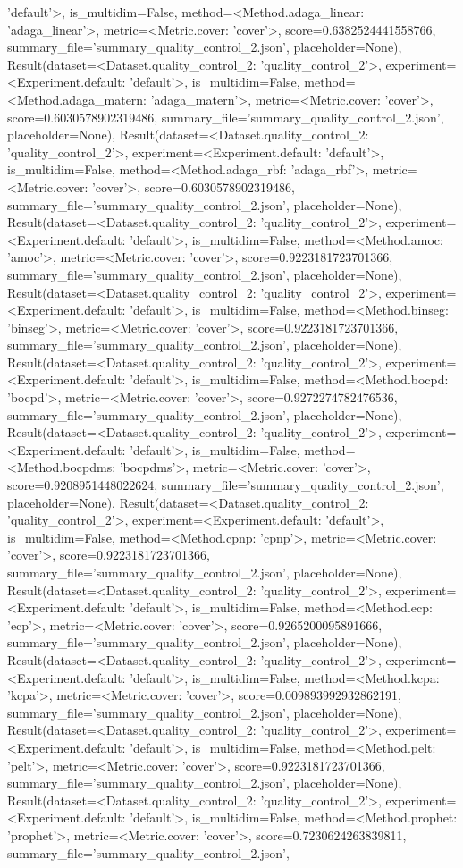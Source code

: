 'default'>, is_multidim=False, method=<Method.adaga_linear: 'adaga_linear'>, metric=<Metric.cover: 'cover'>, score=0.6382524441558766, summary_file='summary_quality_control_2.json', placeholder=None), Result(dataset=<Dataset.quality_control_2: 'quality_control_2'>, experiment=<Experiment.default: 'default'>, is_multidim=False, method=<Method.adaga_matern: 'adaga_matern'>, metric=<Metric.cover: 'cover'>, score=0.6030578902319486, summary_file='summary_quality_control_2.json', placeholder=None), Result(dataset=<Dataset.quality_control_2: 'quality_control_2'>, experiment=<Experiment.default: 'default'>, is_multidim=False, method=<Method.adaga_rbf: 'adaga_rbf'>, metric=<Metric.cover: 'cover'>, score=0.6030578902319486, summary_file='summary_quality_control_2.json', placeholder=None), Result(dataset=<Dataset.quality_control_2: 'quality_control_2'>, experiment=<Experiment.default: 'default'>, is_multidim=False, method=<Method.amoc: 'amoc'>, metric=<Metric.cover: 'cover'>, score=0.9223181723701366, summary_file='summary_quality_control_2.json', placeholder=None), Result(dataset=<Dataset.quality_control_2: 'quality_control_2'>, experiment=<Experiment.default: 'default'>, is_multidim=False, method=<Method.binseg: 'binseg'>, metric=<Metric.cover: 'cover'>, score=0.9223181723701366, summary_file='summary_quality_control_2.json', placeholder=None), Result(dataset=<Dataset.quality_control_2: 'quality_control_2'>, experiment=<Experiment.default: 'default'>, is_multidim=False, method=<Method.bocpd: 'bocpd'>, metric=<Metric.cover: 'cover'>, score=0.9272274782476536, summary_file='summary_quality_control_2.json', placeholder=None), Result(dataset=<Dataset.quality_control_2: 'quality_control_2'>, experiment=<Experiment.default: 'default'>, is_multidim=False, method=<Method.bocpdms: 'bocpdms'>, metric=<Metric.cover: 'cover'>, score=0.9208951448022624, summary_file='summary_quality_control_2.json', placeholder=None), Result(dataset=<Dataset.quality_control_2: 'quality_control_2'>, experiment=<Experiment.default: 'default'>, is_multidim=False, method=<Method.cpnp: 'cpnp'>, metric=<Metric.cover: 'cover'>, score=0.9223181723701366, summary_file='summary_quality_control_2.json', placeholder=None), Result(dataset=<Dataset.quality_control_2: 'quality_control_2'>, experiment=<Experiment.default: 'default'>, is_multidim=False, method=<Method.ecp: 'ecp'>, metric=<Metric.cover: 'cover'>, score=0.9265200095891666, summary_file='summary_quality_control_2.json', placeholder=None), Result(dataset=<Dataset.quality_control_2: 'quality_control_2'>, experiment=<Experiment.default: 'default'>, is_multidim=False, method=<Method.kcpa: 'kcpa'>, metric=<Metric.cover: 'cover'>, score=0.009893992932862191, summary_file='summary_quality_control_2.json', placeholder=None), Result(dataset=<Dataset.quality_control_2: 'quality_control_2'>, experiment=<Experiment.default: 'default'>, is_multidim=False, method=<Method.pelt: 'pelt'>, metric=<Metric.cover: 'cover'>, score=0.9223181723701366, summary_file='summary_quality_control_2.json', placeholder=None), Result(dataset=<Dataset.quality_control_2: 'quality_control_2'>, experiment=<Experiment.default: 'default'>, is_multidim=False, method=<Method.prophet: 'prophet'>, metric=<Metric.cover: 'cover'>, score=0.7230624263839811, summary_file='summary_quality_control_2.json', 